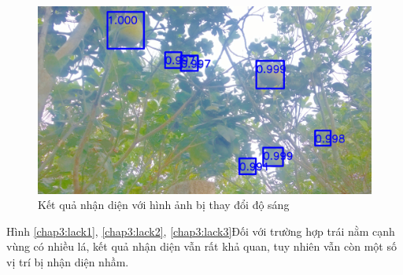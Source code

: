 \begin{center}
    \begin{figure}[H]
    \centering
    \includegraphics[width=0.6\columnwidth]{images/chap3/demo_012.jpg}
    \caption{Kết quả nhận diện với hình ảnh bị thay đổi độ sáng}
    \label{chap3:good6}
    \end{figure}
\end{center}

Hình \ref{chap3:lack1}, \ref{chap3:lack2}, \ref{chap3:lack3}Đối với trường hợp trái nằm cạnh vùng có nhiều lá, kết quả nhận diện vẫn rất khả quan, tuy nhiên vẫn còn một số vị trí bị nhận diện nhầm.

